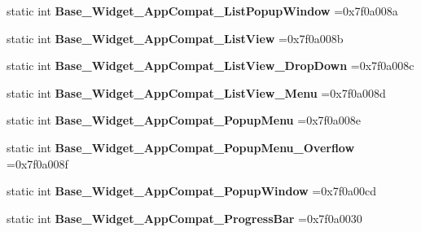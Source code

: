 \begin{DoxyCompactItemize}
static int {\bfseries Base\+\_\+\+Widget\+\_\+\+App\+Compat\+\_\+\+List\+Popup\+Window} =0x7f0a008a
\item 
\mbox{\label{classandroid_1_1support_1_1v7_1_1recyclerview_1_1R_1_1style_aae5285d58975ae4cf4d93bdaed40ad57}} 
static int {\bfseries Base\+\_\+\+Widget\+\_\+\+App\+Compat\+\_\+\+List\+View} =0x7f0a008b
\item 
\mbox{\label{classandroid_1_1support_1_1v7_1_1recyclerview_1_1R_1_1style_a74ef74dfe9c1d9e99132afbb5428c75e}} 
static int {\bfseries Base\+\_\+\+Widget\+\_\+\+App\+Compat\+\_\+\+List\+View\+\_\+\+Drop\+Down} =0x7f0a008c
\item 
\mbox{\label{classandroid_1_1support_1_1v7_1_1recyclerview_1_1R_1_1style_a61d9ff74b250ded41005285b24a8883f}} 
static int {\bfseries Base\+\_\+\+Widget\+\_\+\+App\+Compat\+\_\+\+List\+View\+\_\+\+Menu} =0x7f0a008d
\item 
\mbox{\label{classandroid_1_1support_1_1v7_1_1recyclerview_1_1R_1_1style_ac700cfb4d75021e04718082e200ea536}} 
static int {\bfseries Base\+\_\+\+Widget\+\_\+\+App\+Compat\+\_\+\+Popup\+Menu} =0x7f0a008e
\item 
\mbox{\label{classandroid_1_1support_1_1v7_1_1recyclerview_1_1R_1_1style_a27e6fee92c7fc95c3bc414bc700ced87}} 
static int {\bfseries Base\+\_\+\+Widget\+\_\+\+App\+Compat\+\_\+\+Popup\+Menu\+\_\+\+Overflow} =0x7f0a008f
\item 
\mbox{\label{classandroid_1_1support_1_1v7_1_1recyclerview_1_1R_1_1style_a95295a5745392b7c3b932351f40a1442}} 
static int {\bfseries Base\+\_\+\+Widget\+\_\+\+App\+Compat\+\_\+\+Popup\+Window} =0x7f0a00cd
\item 
\mbox{\label{classandroid_1_1support_1_1v7_1_1recyclerview_1_1R_1_1style_aa1ce37be4ddbe914a9b5922840dc4586}} 
static int {\bfseries Base\+\_\+\+Widget\+\_\+\+App\+Compat\+\_\+\+Progress\+Bar} =0x7f0a0030

\end{DoxyCompactItemize}
